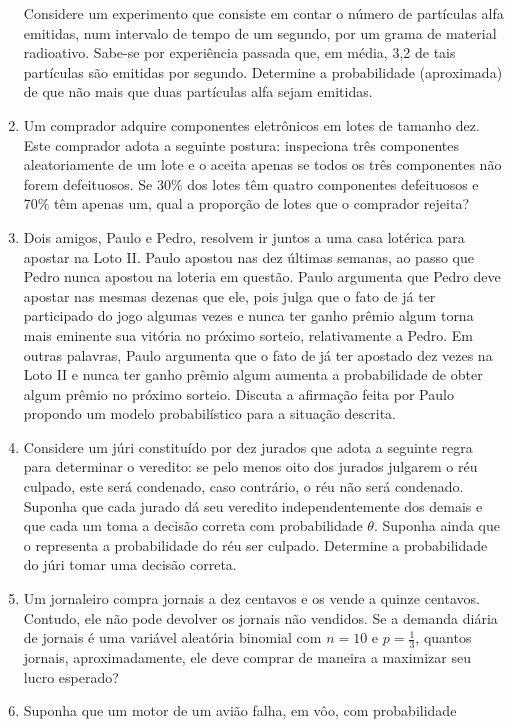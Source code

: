 \documentclass[
  10pt,
]{article}
\begin{document}
\begin{enumerate}
  Considere um experimento que consiste em contar o número de partículas
  alfa emitidas, num intervalo de tempo de um segundo, por um grama de
  material radioativo. Sabe-se por experiência passada que, em média,
  3,2 de tais partículas são emitidas por segundo. Determine a
  probabilidade (aproximada) de que não mais que duas partículas alfa
  sejam emitidas.
\item
  Um comprador adquire componentes eletrônicos em lotes de tamanho dez.
  Este comprador adota a seguinte postura: inspeciona três componentes
  aleatoriamente de um lote e o aceita apenas se todos os três
  componentes não forem defeituosos. Se 30\% dos lotes têm quatro
  componentes defeituosos e 70\% têm apenas um, qual a proporção de
  lotes que o comprador rejeita?
\item
  Dois amigos, Paulo e Pedro, resolvem ir juntos a uma casa lotérica
  para apostar na Loto II. Paulo apostou nas dez últimas semanas, ao
  passo que Pedro nunca apostou na loteria em questão. Paulo argumenta
  que Pedro deve apostar nas mesmas dezenas que ele, pois julga que o
  fato de já ter participado do jogo algumas vezes e nunca ter ganho
  prêmio algum torna mais eminente sua vitória no próximo sorteio,
  relativamente a Pedro. Em outras palavras, Paulo argumenta que o fato
  de já ter apostado dez vezes na Loto II e nunca ter ganho prêmio algum
  aumenta a probabilidade de obter algum prêmio no próximo sorteio.
  Discuta a afirmação feita por Paulo propondo um modelo probabilístico
  para a situação descrita.
\item
  Considere um júri constituído por dez jurados que adota a seguinte
  regra para determinar o veredito: se pelo menos oito dos jurados
  julgarem o réu culpado, este será condenado, caso contrário, o réu não
  será condenado. Suponha que cada jurado dá seu veredito
  independentemente dos demais e que cada um toma a decisão correta com
  probabilidade \(\theta\). Suponha ainda que o representa a
  probabilidade do réu ser culpado. Determine a probabilidade do júri
  tomar uma decisão correta.
\item
  Um jornaleiro compra jornais a dez centavos e os vende a quinze
  centavos. Contudo, ele não pode devolver os jornais não vendidos. Se a
  demanda diária de jornais é uma variável aleatória binomial com
  \(n = 10\) e \(p = \frac{1}{3}\), quantos jornais, aproximadamente,
  ele deve comprar de maneira a maximizar seu lucro esperado?
\item
  Suponha que um motor de um avião falha, em vôo, com probabilidade

\end{enumerate}
\end{document}
